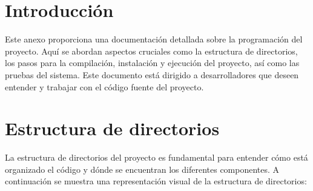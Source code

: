 
\section{Introducción}
Este anexo proporciona una documentación detallada sobre la programación del proyecto. Aquí se abordan aspectos cruciales como la estructura de directorios, los pasos para la compilación, instalación y ejecución del proyecto, así como las pruebas del sistema. Este documento está dirigido a desarrolladores que deseen entender y trabajar con el código fuente del proyecto.

\section{Estructura de directorios}
La estructura de directorios del proyecto es fundamental para entender cómo está organizado el código y dónde se encuentran los diferentes componentes. A continuación se muestra una representación visual de la estructura de directorios:


